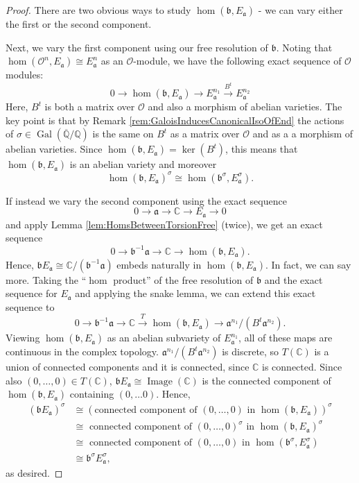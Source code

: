 \documentclass{amsart}
\theoremstyle{definition}
\theoremstyle{remark}
\numberwithin{equation}{section}
\newcommand{\cO}{\mathcal O}
\newcommand{\fka}{\mathfrak a}
\newcommand{\fkb}{\mathfrak b}
\newcommand{\bbC}{\mathbb C}
\newcommand{\bbQ}{\mathbb Q}
\newcommand{\inv}{^{-1}}
\DeclareMathOperator{\Gal}{Gal}
\DeclareMathOperator{\Image}{Image}
\begin{document}
\begin{proof}
 There are two obvious ways to study $\hom(\fkb, E_{\fka})$ - we can vary either the first or the second component.
 
 Next, we vary the first component using our free resolution of $\fkb$. Noting that $\hom(\cO^{n}, E_{\fka}) \cong E_{\fka}^{n}$ as an $\cO$-module, we have the following exact sequence of $\cO$ modules:
 \[
 0 \to \hom(\fkb, E_{\fka}) \to  E_{\fka}^{n_{1}} \overset{B^{t}}{\to} E_{\fka}^{n_{2}} 
 \]
 Here, $B^{t}$ is both a matrix over $\cO$ and also a morphism of abelian varieties. The key point is that by Remark \ref{rem:GaloisInducesCanonicalIsoOfEnd} the actions of $\sigma \in  \Gal(\overline{\bbQ}/ \bbQ)$ is the same on $B^{t}$ as a matrix over $\cO$ and as a a morphism of abelian varieties. Since $\hom(\fkb, E_{\fka}) = \ker(B^{t})$, this means that $\hom(\fkb, E_{\fka})$ is an abelian variety and moreover 
 \[
 \hom(\fkb, E_{\fka})^{\sigma} \cong \hom(\fkb^{\sigma}, E_{\fka}^{\sigma} ).
 \]
 
 If instead we vary the second component using the exact sequence 
 \[
 0 \to \fka \to \bbC \to E_{\fka} \to 0
 \]
 and apply Lemma \ref{lem:HomsBetweenTorsionFree} (twice), we get an exact sequence 
 \[
 0 \to \fkb\inv \fka \to \bbC \to \hom(\fkb, E_{\fka}).
 \]
 Hence, $\fkb E_{\fka} \cong \bbC/(\fkb\inv \fka)$ embeds naturally in $\hom(\fkb, E_{\fka})$. In fact, we can say more. Taking the ``$\hom$ product'' of the free resolution of $\fkb$ and the exact sequence for $E_{\fka}$ and applying the snake lemma, we can extend this exact sequence to
 \[
 0 \to \fkb\inv \fka \to \bbC \overset{T}{\to} \hom(\fkb, E_{\fka}) \to \fka^{n_{1}}/(B^{t} \fka^{n_2}).
 \]
 Viewing $\hom(\fkb, E_{\fka})$ as an abelian subvariety of $E_{\fka}^{n_{1}}$, all of these maps are continuous in the complex topology. $\fka^{n_{1}}/(B^{t} \fka^{n_2})$ is discrete, so $T(\bbC)$ is a union of connected components and it is connected, since $\bbC$ is connected. Since also $(0, \dots, 0) \in T(\bbC)$, $\fkb E_{\fka} \cong \Image(\bbC)$ is the connected component of $\hom(\fkb, E_{\fka})$ containing $(0,\dots 0)$. Hence,
 \begin{align*}
 (\fkb E_{\fka})^{\sigma} & \cong (\text{connected component of $(0, \dots, 0)$ in } \hom(\fkb, E_{\fka}))^{\sigma}\\
 & \cong \text{ connected component of $(0, \dots, 0)^{\sigma}$ in } \hom(\fkb, E_{\fka})^{\sigma}\\
 & \cong \text{ connected component of $(0, \dots, 0)$ in } \hom(\fkb^{\sigma}, E_{\fka}^{\sigma})\\
 & \cong \fkb^{\sigma} E_{\fka}^{\sigma},
 \end{align*}
 as desired. 
 \end{proof}
 
\end{document}
